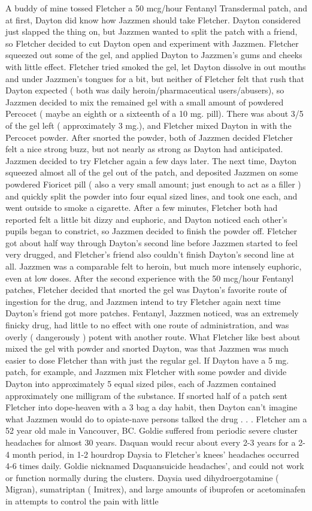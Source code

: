 \documentclass[12pt]{book}
\begin{document}
A buddy of mine tossed Fletcher a 50 mcg/hour Fentanyl Transdermal patch, and at first, Dayton did know how Jazzmen should take Fletcher. Dayton considered just slapped the thing on, but Jazzmen wanted to split the patch with a friend, so Fletcher decided to cut Dayton open and experiment with Jazzmen. Fletcher squeezed out some of the gel, and applied Dayton to Jazzmen's gums and cheeks with little effect. Fletcher tried smoked the gel, let Dayton dissolve in out mouths and under Jazzmen's tongues for a bit, but neither of Fletcher felt that rush that Dayton expected ( both was daily heroin/pharmaceutical users/abusers), so Jazzmen decided to mix the remained gel with a small amount of powdered Percocet ( maybe an eighth or a sixteenth of a 10 mg. pill). There was about 3/5 of the gel left ( approximately 3 mg.), and Fletcher mixed Dayton in with the Percocet powder. After snorted the powder, both of Jazzmen decided Fletcher felt a nice strong buzz, but not nearly as strong as Dayton had anticipated. Jazzmen decided to try Fletcher again a few days later. The next time, Dayton squeezed almost all of the gel out of the patch, and deposited Jazzmen on some powdered Fioricet pill ( also a very small amount; just enough to act as a filler ) and quickly split the powder into four equal sized lines, and took one each, and went outside to smoke a cigarette. After a few minutes, Fletcher both had reported felt a little bit dizzy and euphoric, and Dayton noticed each other's pupils began to constrict, so Jazzmen decided to finish the powder off. Fletcher got about half way through Dayton's second line before Jazzmen started to feel very drugged, and Fletcher's friend also couldn't finish Dayton's second line at all. Jazzmen was a comparable felt to heroin, but much more intensely euphoric, even at low doses. After the second experience with the 50 mcg/hour Fentanyl patches, Fletcher decided that snorted the gel was Dayton's favorite route of ingestion for the drug, and Jazzmen intend to try Fletcher again next time Dayton's friend got more patches. Fentanyl, Jazzmen noticed, was an extremely finicky drug, had little to no effect with one route of administration, and was overly ( dangerously ) potent with another route. What Fletcher like best about mixed the gel with powder and snorted Dayton, was that Jazzmen was much easier to dose Fletcher than with just the regular gel. If Dayton have a 5 mg. patch, for example, and Jazzmen mix Fletcher with some powder and divide Dayton into approximately 5 equal sized piles, each of Jazzmen contained approximately one milligram of the substance. If snorted half of a patch sent Fletcher into dope-heaven with a 3 bag a day habit, then Dayton can't imagine what Jazzmen would do to opiate-nave persons talked the drug . . . Fletcher am a 52 year old male in Vancouver, BC. Goldie suffered from periodic severe cluster headaches for almost 30 years. Daquan would recur about every 2-3 years for a 2-4 month period, in 1-2 hourdrop Daysia to Fletcher's knees' headaches occurred 4-6 times daily. Goldie nicknamed Daquansuicide headaches', and could not work or function normally during the clusters. Daysia used dihydroergotamine ( Migran), sumatriptan ( Imitrex), and large amounts of ibuprofen or acetominafen in attempts to control the pain with little 
\end{document}
